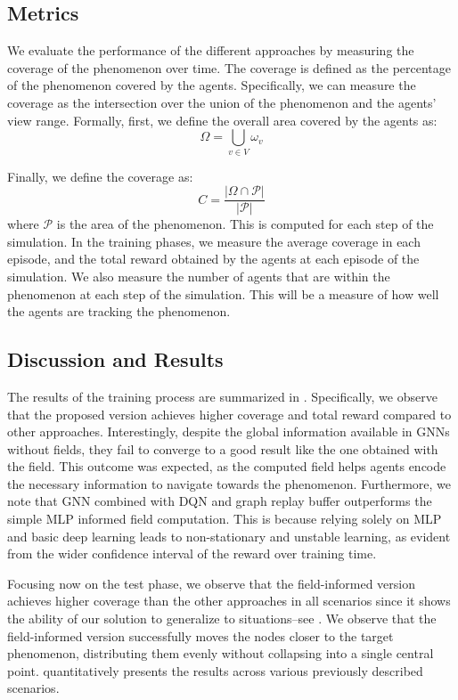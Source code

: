 \documentclass[conference]{IEEEtran}
\begin{document}
\subsection{Metrics}
We evaluate the performance of the different approaches by measuring the coverage of the phenomenon over time.
%
The coverage is defined as the percentage of the phenomenon covered by the agents.
%
Specifically, we can measure the coverage as the intersection over the union of the phenomenon and the agents' view range.
%
Formally, first, we define the overall area covered by the agents as:
\begin{equation*}
\Omega = \bigcup_{v \in V} \omega_v
\end{equation*}

Finally, we define the coverage as:
\begin{equation*}
C = \frac{|\Omega \cap \mathcal{P}|}{|\mathcal{P}|}
\end{equation*}
where $\mathcal{P}$ is the area of the phenomenon.
This is computed for each step of the simulation. 
In the training phases, 
 we measure the average coverage in each episode, and the total reward obtained by the agents at each episode of the simulation. 
%
We also measure the number of agents that are within the phenomenon at each step of the simulation.
This will be a measure of how well the agents are tracking the phenomenon.

\subsection{Discussion and Results}
The results of the training process are summarized in . 
%
Specifically, we observe that the proposed version achieves higher coverage and total reward compared to other approaches. 
%
Interestingly, despite the global information available in \acp{GNN} without fields, they fail to converge to a good result like the one obtained with the field. 
%
This outcome was expected, as the computed field helps agents encode the necessary information to navigate towards the phenomenon.
%
Furthermore, we note that \ac{GNN} combined with \ac{DQN} and graph replay buffer outperforms the simple \ac{MLP} informed field computation. 
%
This is because relying solely on \ac{MLP} and basic deep learning leads to non-stationary and unstable learning, 
 as evident from the wider confidence interval of the reward over training time.

Focusing now on the test phase, %
 we observe that the field-informed version achieves higher coverage than the other approaches in all scenarios since it shows the ability of our solution to generalize to situations--see . 
% 
We observe that the field-informed version successfully moves the nodes closer to the target phenomenon, 
 distributing them evenly without collapsing into a single central point. 
  quantitatively presents the results across various previously described scenarios.
\end{document}
